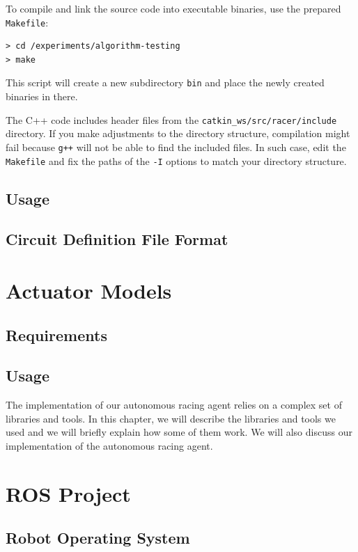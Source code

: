 To compile and link the source code into executable binaries, use the prepared \texttt{Makefile}:

\begin{verbatim}
> cd /experiments/algorithm-testing
> make
\end{verbatim}

This script will create a new subdirectory \texttt{bin} and place the newly created binaries in there.

The C++ code includes header files from the \texttt{catkin\_ws/src/racer/include} directory. If you make adjustments to the directory structure, compilation might fail because \texttt{g++} will not be able to find the included files. In such case, edit the \texttt{Makefile} and fix the paths of the \texttt{-I} options to match your directory structure.

\subsection{Usage}

\subsection{Circuit Definition File Format}

\section{Actuator Models}

\subsection{Requirements}

\subsection{Usage}

The implementation of our autonomous racing agent relies on a complex set of libraries and tools. In this chapter, we will describe the libraries and tools we used and we will briefly explain how some of them work. We will also discuss our implementation of the autonomous racing agent.

\section{ROS Project}

\subsection{Robot Operating System}

